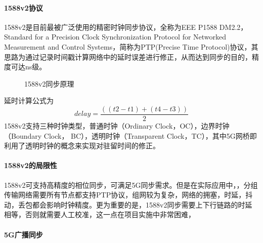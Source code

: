 \documentclass[UTF8,a4paper,12pt]{ctexart}
\numberwithin{equation}{section}
\begin{document}
\paragraph{1588v2协议}
1588v2是目前最被广泛使用的精密时钟同步协议，全称为EEE P1588 DM2.2， Standard for a Precision Clock Synchronization Protocol for Networked Measurement and Control Systems，简称为PTP(Precise Time Protocol)协议，其思路为通过记录时间戳计算网络中的延时误差进行修正，从而达到同步的目的，精度可达ns级。
\begin{figure}[htb] 
	\caption{1588v2同步原理}
\end{figure}

延时计算公式为
\begin{equation*}
	delay = \frac{((t2-t1)+(t4-t3))}{2} 
\end{equation*}
1588v2支持三种时钟类型，普通时钟（Ordinary Clock，OC），边界时钟（Boundary Clock， BC），透明时钟（Transparent Clock，TC），其中5G网桥即利用了透明时钟的概念来实现对驻留时间的修正。
\paragraph{1588v2的局限性}
1588v2可支持高精度的相位同步，可满足5G同步需求。但是在实际应用中，，分组传输网络需要所有节点都支持PTP协议，组网较为复杂，网络的拥塞，时延，抖动，丢包都会影响时钟精度。更为重要的是，1588v2同步需要上下行链路的时延相等，否则就需要人工校准，这一点在项目实施中非常困难，
\paragraph{5G广播同步}
\end{document}
